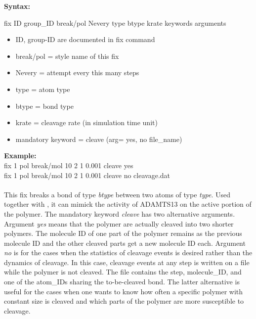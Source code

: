 {\bfseries Syntax:}

fix ID group\_ID break/pol Nevery type btype krate keywords arguments

\begin{itemize}

  \item ID, group-ID are documented in fix command

  \item break/pol = style name of this fix

  \item Nevery = attempt every this many steps

  \item type = atom type

  \item btype = bond type

  \item krate = cleavage rate (in simulation time unit)

  \item mandatory keyword = cleave (arg= yes, no file\_name)
  
\end{itemize}

\textbf{Example:}\\
fix 1 pol break/mol 10 2 1 0.001 cleave yes
\\
fix 1 pol break/mol 10 2 1 0.001 cleave no cleavage.dat
\\ \\

  This fix breaks a bond of type \emph{btype} between two atoms of type \emph{type}. Used together with , it can mimick the activity of ADAMTS13 on the active portion of the polymer. The mandatory keyword \emph{cleave} has two alternative arguments. Argument \emph{yes} means that the polymer are actually cleaved into two shorter polymers. The molecule ID of one part of the polymer remains as the previous molecule ID and the other cleaved parts get a new molecule ID each. Argument \emph{no} is for the cases when the statistics of cleavage events is desired rather than the dynamics of cleavage. In this case, cleavage events at any step is written on a file while the polymer is not cleaved. The file contains the step, molecule\_ID, and one of the atom\_IDs sharing the to-be-cleaved bond. The latter alternative is useful for the cases when one wants to know how often a specific polymer with constant size is cleaved and which parts of the polymer are more susceptible to cleavage.
  
